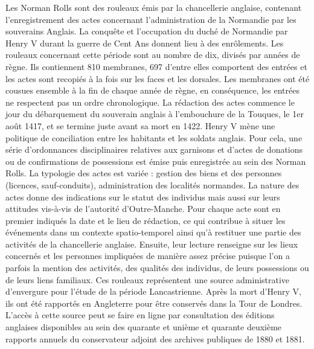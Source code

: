 \documentclass[a4paper,12pt,twoside]{book}
\begin{document}
            \medskip
        
            Les Norman Rolls sont des rouleaux émis par la chancellerie anglaise, contenant l’enregistrement des actes concernant l’administration de la Normandie par les souverains Anglais. 
               La conquête et l’occupation du duché de Normandie par Henry V durant la guerre de Cent Ans donnent lieu à des enrôlements. 
               Les rouleaux concernant cette période sont au nombre de dix, divisés par années de règne. 
               Ils contiennent 810 membranes, 697 d’entre elles comportent des entrées et les actes sont recopiés à la fois sur les faces et les dorsales. 
               Les membranes ont été cousues ensemble à la fin de chaque année de règne, en conséquence, les entrées ne respectent pas un ordre chronologique. 
               La rédaction des actes commence le jour du débarquement du souverain anglais à l'embouchure de la Touques, le 1er août 1417, et se termine juste avant sa mort en 1422. 
               Henry V mène une politique de conciliation entre les habitants et les soldats anglais. 
               Pour cela, une série d'ordonnances disciplinaires relatives aux garnisons et d’actes de donations ou de confirmations de possessions est émise puis enregistrée au sein des Norman Rolls. 
               La typologie des actes est variée : gestion des biens et des personnes (licences, sauf-conduits), administration des localités normandes. 
               La nature des actes donne des indications sur le statut des individus mais aussi sur leurs attitudes vis-à-vis de l’autorité d’Outre-Manche. 
               Pour chaque acte sont en premier indiqués la date et le lieu de rédaction, ce qui contribue à situer les événements dans un contexte spatio-temporel ainsi qu’à restituer une partie des activités de la chancellerie anglaise. 
               Ensuite, leur lecture renseigne sur les lieux concernés et les personnes impliquées de manière assez précise puisque l’on a parfois la mention des activités, des qualités des individus, de leurs possessions ou de leurs liens familiaux. 
               Ces rouleaux représentent une source administrative d’envergure pour l’étude de la période Lancastrienne. 
               Après la mort d’Henry V, ils ont été rapportés en Angleterre pour être conservés dans la Tour de Londres. 
               L’accès à cette source peut se faire en ligne par consultation des éditions anglaises disponibles au sein des quarante et unième et quarante deuxième rapports annuels du conservateur adjoint des archives publiques de 1880 et 1881. 
        
\end{document}
